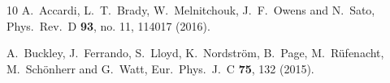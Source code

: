 \begin{thebibliography}{10}
  A.~Accardi, L.~T.~Brady, W.~Melnitchouk, J.~F.~Owens and N.~Sato,
  Phys.\ Rev.\ D {\bf 93}, no. 11, 114017 (2016).
  
  A.~Buckley, J.~Ferrando, S.~Lloyd, K.~Nordstr\"om, B.~Page, M.~R\"ufenacht, M.~Sch\"onherr and G.~Watt,
  Eur.\ Phys.\ J.\ C {\bf 75}, 132 (2015).

  
\end{thebibliography}
